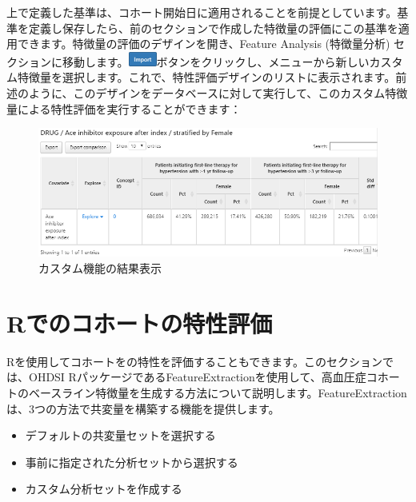 \documentclass[
  11pt]{book}
\providecommand{\tightlist}{%
  \setlength{\itemsep}{0pt}\setlength{\parskip}{0pt}}
\theoremstyle{definition}
\theoremstyle{definition}
\theoremstyle{definition}
\theoremstyle{definition}
\theoremstyle{remark}
\begin{document}
上で定義した基準は、コホート開始日に適用されることを前提としています。基準を定義し保存したら、前のセクションで作成した特徴量の評価にこの基準を適用できます。特徴量の評価のデザインを開き、Feature Analysis (特徴量分析) セクションに移動します。\includegraphics{images/Characterization/atlasImportButton.png}ボタンをクリックし、メニューから新しいカスタム特徴量を選択します。これで、特性評価デザインのリストに表示されます。前述のように、このデザインをデータベースに対して実行して、このカスタム特徴量による特性評価を実行することができます：

\begin{figure}

{\centering \includegraphics[width=1\linewidth]{images/Characterization/atlasCharacterizationCustomFeatureResults} 

}

\caption{カスタム機能の結果表示}\label{fig:atlasCharacterizationCustomFeatureResults}
\end{figure}

\section{Rでのコホートの特性評価}\label{rux3067ux306eux30b3ux30dbux30fcux30c8ux306eux7279ux6027ux8a55ux4fa1}

Rを使用してコホートをの特性を評価することもできます。このセクションでは、OHDSI RパッケージであるFeatureExtractionを使用して、高血圧症コホートのベースライン特徴量を生成する方法について説明します。FeatureExtractionは、3つの方法で共変量を構築する機能を提供します。 

\begin{itemize}
\tightlist
\item
  デフォルトの共変量セットを選択する
\item
  事前に指定された分析セットから選択する
\item
  カスタム分析セットを作成する
\end{itemize}
\end{document}
